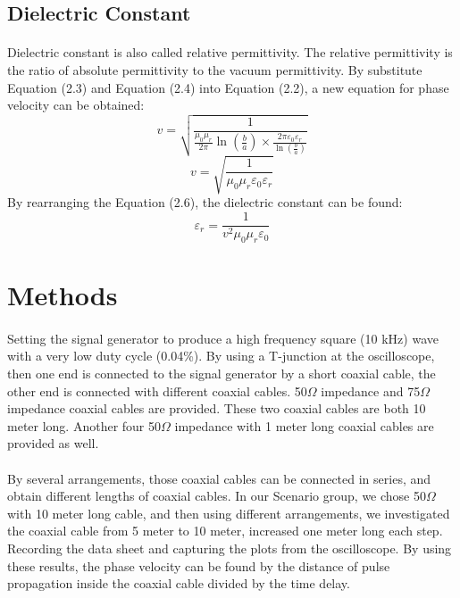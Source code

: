 \documentclass[12pt]{article}
\begin{document}
    \subsection{Dielectric Constant}
    \paragraph{}
    Dielectric constant is also called relative permittivity. The relative permittivity is the ratio of absolute permittivity to the vacuum permittivity. By substitute Equation (2.3) and Equation (2.4) into Equation (2.2), a new equation for phase velocity can be obtained:
    \begin{equation}
        v=\sqrt{\frac{1}{\frac{\mu_{0}\mu_{r}}{2\pi}\ln(\frac{b}{a})\times \frac{2\pi\varepsilon_{0}\varepsilon_{r}}{\ln(\frac{b}{a})}}}
    \end{equation}
    \begin{equation}
        v=\sqrt{\frac{1}{\mu_{0}\mu_{r}\varepsilon_{0}\varepsilon_{r}}}
    \end{equation}
    By rearranging the Equation (2.6), the dielectric constant can be found:
    \begin{equation}
        \varepsilon_{r}=\frac{1}{v^2\mu_{0}\mu_{r}\varepsilon_{0}}
    \end{equation}
    
    
    \section{Methods}
    \paragraph{}
    Setting the signal generator to produce a high frequency square (10 kHz) wave with a very low duty cycle (0.04\%). By using a T-junction at the oscilloscope, then one end is connected to the signal generator by a short coaxial cable, the other end is connected with different coaxial cables. 50$\Omega$ impedance and 75$\Omega$ impedance coaxial cables are provided. These two coaxial cables are both 10 meter long. Another four 50$\Omega$ impedance with 1 meter long coaxial cables are provided as well.
    \paragraph{}
    By several arrangements, those coaxial cables can be connected in series, and obtain different lengths of coaxial cables. In our Scenario group, we chose 50$\Omega$ with 10 meter long cable, and then using different arrangements, we investigated the coaxial cable from 5 meter to 10 meter, increased one meter long each step. Recording the data sheet and capturing the plots from the oscilloscope.  By using these results, the phase velocity can be found by the distance of pulse propagation inside the coaxial cable divided by the time delay.
\end{document}

